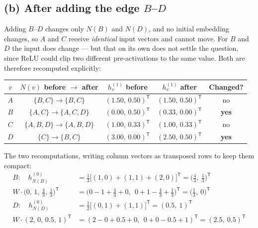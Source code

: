 \documentclass[11pt]{article}
\begin{document}
\subsection*{(b) After adding the edge $B$--$D$}

Adding $B$--$D$ changes only $N(B)$ and $N(D)$, and no initial embedding changes, so $A$ and
$C$ receive \emph{identical} input vectors and cannot move. For $B$ and $D$ the input does
change --- but that on its own does not settle the question, since $\mathrm{ReLU}$ could
clip two different pre-activations to the same value. Both are therefore recomputed
explicitly:

\begin{center}
\begin{tabular}{c c c c c}
\toprule
\rowcolor{white}
$v$ & $N(v)$ before $\rightarrow$ after & $h_v^{(1)}$ before & $h_v^{(1)}$ after & Changed? \\
\midrule
$A$ & $\{B,C\}\rightarrow\{B,C\}$     & $(1.50,\,0.50)^{\mathsf T}$ & $(1.50,\,0.50)^{\mathsf T}$ & no \\
$B$ & $\{A,C\}\rightarrow\{A,C,D\}$   & $(0.00,\,0.50)^{\mathsf T}$ & $\mathbf{(0.33,\,0.00)^{\mathsf T}}$ & \textbf{yes} \\
$C$ & $\{A,B,D\}\rightarrow\{A,B,D\}$ & $(1.00,\,0.33)^{\mathsf T}$ & $(1.00,\,0.33)^{\mathsf T}$ & no \\
$D$ & $\{C\}\rightarrow\{B,C\}$       & $(3.00,\,0.00)^{\mathsf T}$ & $\mathbf{(2.50,\,0.50)^{\mathsf T}}$ & \textbf{yes} \\
\bottomrule
\end{tabular}
\end{center}

\noindent The two recomputations, writing column vectors as transposed rows to keep them
compact:
\begin{align*}
  B:\quad h_{N(B)}^{(0)}
    &= \tfrac13\bigl[(1,0)+(1,1)+(2,0)\bigr]^{\mathsf T}
     = \bigl(\tfrac43,\ \tfrac13\bigr)^{\mathsf T} \\
  W\!\cdot\!\bigl(0,\,1,\,\tfrac43,\,\tfrac13\bigr)^{\mathsf T}
    &= \bigl(0-1+\tfrac43+0,\ \ 0+1-\tfrac43+\tfrac13\bigr)^{\mathsf T}
     = \bigl(\tfrac13,\ 0\bigr)^{\mathsf T} \\[5pt]
  D:\quad h_{N(D)}^{(0)}
    &= \tfrac12\bigl[(0,1)+(1,1)\bigr]^{\mathsf T}
     = (0.5,\ 1)^{\mathsf T} \\
  W\!\cdot\!(2,\,0,\,0.5,\,1)^{\mathsf T}
    &= (2-0+0.5+0,\ \ 0+0-0.5+1)^{\mathsf T}
     = (2.5,\ 0.5)^{\mathsf T}
\end{align*}
\end{document}
